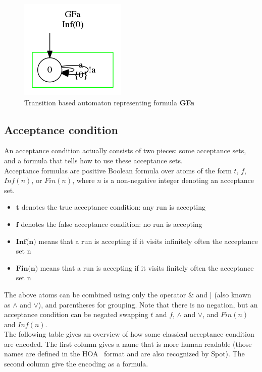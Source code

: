 \begin{figure}[H]
 \centering
 \includegraphics[scale=0.8]{img/trans_based.png}
 \caption{Transition based automaton representing formula \textbf{GFa}}
 \label{fig:transition_based}
\end{figure}

\subsection{Acceptance condition}
An acceptance condition actually consists of two pieces: some acceptance sets, and a formula that tells
how to use these acceptance sets.\\

Acceptance formulas are positive Boolean formula over atoms of the form $t$, $f$, $Inf(n)$, or $Fin(n)$,
where $n$ is a non-negative integer denoting an acceptance set.
\begin{itemize}
 \item $\textbf{t}$ denotes the true acceptance condition: any run is accepting
 \item $\textbf{f}$ denotes the false acceptance condition: no run is accepting
 \item $\textbf{Inf(n)}$ means that a run is accepting if it visits infinitely often the acceptance set n
 \item $\textbf{Fin(n)}$ means that a run is accepting if it visits finitely often the acceptance set n
\end{itemize}

The above atoms can be combined using only the operator $\&$ and $|$ (also known as $\land$ and $\lor$), and
parentheses for grouping. Note that there is no negation, but an acceptance condition can be negated
swapping $t$ and $f$, $\land$ and $\lor$, and $Fin(n)$ and $Inf(n)$.\\

The following table gives an overview of how some classical acceptance condition are encoded. The first
column gives a name that is more human readable (those names are defined in the HOA~\cite{3} format and
are also recognized by Spot). The second column give the encoding as a formula.

